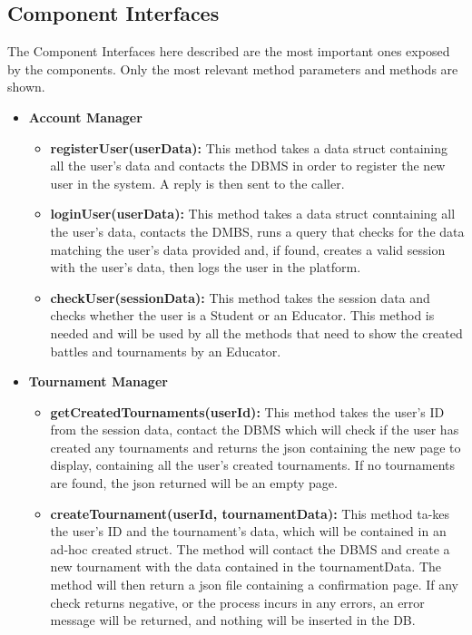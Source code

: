 \documentclass{article}
\begin{document}
{\subsection{Component Interfaces}
The Component Interfaces here described are the most important ones exposed by the components.
Only the most relevant method parameters and methods are shown.
\begin{itemize}
\item \textbf{Account Manager}
    \begin{itemize}
        \item \textbf{registerUser(userData):} This method takes a data struct containing all the user's data and contacts the DBMS in order to 
        register the new user in the system. A reply is then sent to the caller.
        \item \textbf{loginUser(userData):} This method takes a data struct conntaining all the user's data, contacts the DMBS, runs a query that checks
        for the data matching the user's data provided and, if found, creates a valid session with the user's data, then logs the user in the platform.
        \item \textbf{checkUser(sessionData):} This method takes the session data and checks whether the user is a Student or an Educator.
        This method is needed and will be used by all the methods that need to show the created battles and tournaments by an Educator.
    \end{itemize}
    \item \textbf{Tournament Manager}
    \begin{itemize}
        \item \textbf{getCreatedTournaments(userId):} This method takes the user's ID from the session data, contact the DBMS which will check 
        if the user has created any tournaments and returns the json containing the new page to display, containing all the user's created tournaments.
        If no tournaments are found, the json returned will be an empty page.
        \item \textbf{createTournament(userId, tournamentData):} This method ta-kes the user's ID and the tournament's data, which will be contained in an ad-hoc
        created struct. The method will contact the DBMS and create a new tournament with the data contained in the tournamentData. 
        The method will then return a json file containing a confirmation page.
        If any check returns negative, or the process incurs in any errors, an error message will be returned, and nothing will be inserted in the DB.

\end{itemize}
\end{itemize}}
\end{document}
